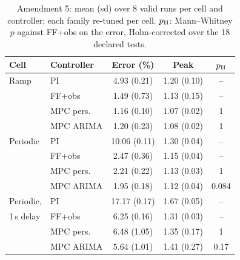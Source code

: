 \begin{table}[t]\centering\footnotesize
\caption{Amendment 5: mean (sd) over 8 valid runs per cell and controller; each family re-tuned per cell. $p_{\rm H}$: Mann--Whitney $p$ against FF+obs on the error, Holm-corrected over the 18 declared tests.}\label{tab:scn}
\begin{tabular}{llccc}\toprule
Cell & Controller & Error (\%) & Peak & $p_{\rm H}$\\\midrule
Ramp & PI & 4.93 (0.21) & 1.20 (0.10) & --\\
 & FF+obs & 1.49 (0.73) & 1.13 (0.15) & --\\
 & MPC pers. & 1.16 (0.10) & 1.07 (0.02) & 1\\
 & MPC ARIMA & 1.20 (0.23) & 1.08 (0.02) & 1\\\midrule
Periodic & PI & 10.06 (0.11) & 1.30 (0.04) & --\\
 & FF+obs & 2.47 (0.36) & 1.15 (0.04) & --\\
 & MPC pers. & 2.21 (0.22) & 1.13 (0.03) & 1\\
 & MPC ARIMA & 1.95 (0.18) & 1.12 (0.04) & 0.084\\\midrule
Periodic, & PI & 17.17 (0.17) & 1.67 (0.05) & --\\
1\,s delay & FF+obs & 6.25 (0.16) & 1.31 (0.03) & --\\
 & MPC pers. & 6.48 (1.05) & 1.35 (0.17) & 1\\
 & MPC ARIMA & 5.64 (1.01) & 1.41 (0.27) & 0.17\\
\bottomrule\end{tabular}\end{table}
